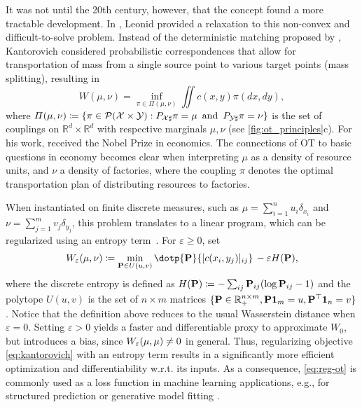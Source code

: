 It was not until the 20th century, however, that the concept found a more tractable development. In \citeyear{kantorovich1942transfer}, Leonid \citeauthor{kantorovich1942transfer} provided a relaxation to this non-convex and difficult-to-solve problem.
Instead of the deterministic matching proposed by \citeauthor{monge1781histoire}, Kantorovich considered probabilistic correspondences that allow for transportation of mass from a single source point to various target points (mass splitting), resulting in
\begin{equation} \label{eq:kantorovich}
    W(\mu, \nu) = \inf_{\pi\in \Pi(\mu,\nu)}\iint c(x, y) \pi(dx, dy),
\end{equation}
where $\Pi(\mu, \nu) \coloneqq \left\{\pi \in {\mathcal{P}}(\mathcal{X} \times \mathcal{Y}): P_{{\mathcal{X}} \sharp} \pi=\mu \, \text { and } \, P_{{\mathcal{Y}} \sharp} \pi=\nu\right\}$ is the set of couplings on $\mathbb{R}^d\times\mathbb{R}^d$ with respective marginals $\mu, \nu$ (see \cref{fig:ot_principles}c).
For his work, \citeauthor{kantorovich1942transfer} received the Nobel Prize in economics. The connections of \acrshort{OT} to basic questions in economy becomes clear when interpreting $\mu$ as a density of resource units, and $\nu$ a density of factories, where the coupling $\pi$ denotes the optimal transportation plan of distributing resources to factories.

When instantiated on finite discrete measures, such as $\mu=\sum_{i=1}^n u_i\delta_{x_i}$ and $\nu=\sum_{j=1}^m v_j\delta_{y_j}$, this problem translates to a linear program, which can be regularized using an entropy term~\citep{cuturi2013sinkhorn,peyre2019computational}. For $\varepsilon\geq0$, set 
\begin{equation} \label{eq:reg-ot}
\We(\mu,\nu) \defeq \min_{\bP\in U(u, v)} \dotp{\bP}{[c(x_i, y_j)]_{ij}}  \,-\varepsilon H(\bP),
\end{equation}
where the discrete entropy is defined as $H(\mathbf{P}) \coloneqq -\sum_{ij} \mathbf{P}_{ij} (\log \mathbf{P}_{ij} - 1)$ and the polytope $U(u, v)$ is the set of $n\times m$ matrices $\{\mathbf{P}\in\mathbb{R}^{n \times m}_+, \mathbf{P}\mathbf{1}_m =u, \mathbf{P}^\top\mathbf{1}_n=v\}$. 
Notice that the definition above reduces to the usual Wasserstein distance when $\varepsilon=0$. Setting $\varepsilon>0$ yields a faster and differentiable proxy to approximate $W_{0}$, but introduces a bias, since $W_{\varepsilon}(\mu,\mu)\ne 0$ in general.
Thus, regularizing objective \eqref{eq:kantorovich} with an entropy term results in a significantly more efficient optimization \citep{cuturi2013sinkhorn} and differentiability w.r.t. its inputs. As a consequence, \eqref{eq:reg-ot} is commonly used as a loss function in machine learning applications, e.g., for structured prediction \citep{frogner2015learning,janati2020multi} or generative model fitting \citep{arjovsky2017wasserstein, salimans2018improving, genevay2018learning}.


